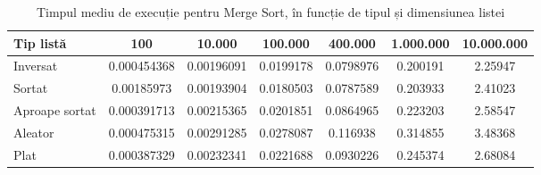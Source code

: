 \documentclass{article}
\begin{document}
\begin{table}[H]
\centering
\begin{tabular}{|l|c|c|c|c|c|c|}
\hline
\textbf{Tip listă} & \textbf{100} & \textbf{10.000} & \textbf{100.000} & \textbf{400.000} & \textbf{1.000.000} & \textbf{10.000.000} \\
\hline
Inversat & 0.000454368 & 0.00196091 & 0.0199178 & 0.0798976 & 0.200191 & 2.25947 \\
\hline
Sortat & 0.00185973 & 0.00193904 & 0.0180503 & 0.0787589 & 0.203933 & 2.41023 \\
\hline
Aproape sortat & 0.000391713 & 0.00215365 & 0.0201851 & 0.0864965 & 0.223203 & 2.58547 \\
\hline
Aleator & 0.000475315 & 0.00291285 & 0.0278087 & 0.116938 & 0.314855 & 3.48368 \\
\hline
Plat & 0.000387329 & 0.00232341 & 0.0221688 & 0.0930226 & 0.245374 & 2.68084 \\
\hline
\end{tabular}
\caption{Timpul mediu de execuție pentru Merge Sort, în funcție de tipul și dimensiunea listei}
\label{tab:rezultate-merge}
\end{table}
\end{document}

